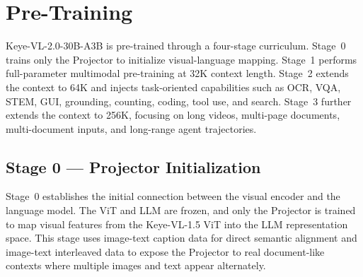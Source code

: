 \documentclass{llmxive}
\begin{document}
\section{Pre-Training}


Keye-VL-2.0-30B-A3B is pre-trained through a four-stage curriculum. Stage~0 trains only the Projector to initialize visual-language mapping. Stage~1 performs full-parameter multimodal pre-training at 32K context length. Stage~2 extends the context to 64K and injects task-oriented capabilities such as OCR, VQA, STEM, GUI, grounding, counting, coding, tool use, and search. Stage~3 further extends the context to 256K, focusing on long videos, multi-page documents, multi-document inputs, and long-range agent trajectories.



\subsection{Stage 0 --- Projector Initialization}
\label{stage_0}

Stage~0 establishes the initial connection between the visual encoder and the language model. The ViT and LLM are frozen, and only the Projector is trained to map visual features from the Keye-VL-1.5 ViT into the LLM representation space. This stage uses image-text caption data for direct semantic alignment and image-text interleaved data to expose the Projector to real document-like contexts where multiple images and text appear alternately.
\end{document}
